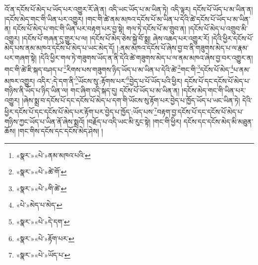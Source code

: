 འོ་ན་དངོས་པོ་མེད་པ་ཡོད་པར་འགྱུར་རོ་ཞེ་ན། འདི་ཡང་ཡོད་པ་མ་ཡིན་ཏེ། འདི་ལྟར། དངོས་པོ་ཡོད་པ་མ་ཡིན་ན། །དངོས་མེད་གང་གི་ཡིན་པར་འགྱུར། །གང་གི་ཚེ་ནམ་མཁའ་དངོས་པོ་མ་ཡིན་པ་དེའི་ཚེ་དངོས་པོ་ཡོད་པ་མ་ཡིན་ན། དངོས་པོ་མེད་པ་གང་གི་ཡིན་པར་བརྟག་པར་བྱ་སྟེ། གལ་ཏེ་དངོས་པོ་མ་གྲུབ་ན། །དངོས་པོ་མེད་པ་འགྲུབ་མི་འགྱུར། །དངོས་པོ་གཞན་དུ་གྱུར་པ་ལ། །དངོས་པོ་མེད་ཅེས་སྐྱེ་བོ་སྨྲ། ཞེས་འཆད་པར་འགྱུར་རོ། །དེའི་ཕྱིར་དངོས་པོ་མེད་པས་ནམ་མཁའ་དངོས་པོ་མེད་པ་ཡང་མེད་དོ། །:ནམ་མཁའ་དངོས་པོ་ཞེས་བྱ་བ་ནི་གཟུགས་མེད་པ་ལ་རྣམ་པར་གཞག་སྟེ། །དེའི་ཕྱིར་གལ་ཏེ་གཟུགས་ཡོད་ན་ནི་དེའི་ཚེ་གཟུགས་མེད་པ་ལ་ནམ་མཁའ་ཞེས་བྱ་བར་འགྱུར་ན། གང་གི་ཚེ་ཇི་སྐད་བཤད་པ་\footnote{«སྣར་»«པེ་»ནམ་མཁའ་པའི་}རིགས་པས་གཟུགས་ཉིད་ཡོད་པ་མ་ཡིན་པ་དེའི་ཚེ་\footnote{«སྣར་»«པེ་»ཚེ་གོ་}གང་གི་\footnote{«སྣར་»«པེ་»གི་ཚེ་}དངོས་པོ་མེད་\footnote{«པེ་»མེད་པ་མེད་}པ་ནམ་མཁར་འགྱུར། འདིར་:དེ་དག་ནི་\footnote{«སྣར་»«པེ་»དེ་དག་}ཡོངས་སུ་:རྟོགས་པར་\footnote{«སྣར་»«པེ་»རྟོག་པར་}བྱེད་པ་པོ་ཡོད་པའི་ཕྱིར། དངོས་པོ་དང་དངོས་པོ་མེད་པ་གཉིས་ནི་ཡོད་པ་ཉིད་ཡིན་ལ། གང་ཞིག་འདི་སྐད་དུ། དངོས་པོ་ཡོད་པ་མ་ཡིན་ན། །དངོས་མེད་གང་གི་ཡིན་པར་འགྱུར། །ཞེས་སྨྲ་བ་དངོས་པོ་དང་དངོས་པོ་མེད་པ་དག་གི་ཡོངས་སུ་རྟོག་པར་བྱེད་པ་ཁྱོད་ཡོད་པ་ཡང་ཡིན་ཏེ། དེའི་ཕྱིར་དངོས་པོ་དང་དངོས་པོ་མེད་པར་རྟོག་པར་བྱེད་པ་ཁྱོད་:ཡོད་པས་\footnote{«སྣར་»«པེ་»ཡོད་པ་}བརྟག་བྱ་དངོས་པོ་དང་དངོས་པོ་མེད་པ་གཉིས་ཀྱང་ཡོད་པ་ཡིན་ནོ་ཞེས་སྨྲའོ། །བརྗོད་པ་འདི་ཡང་མི་རུང་སྟེ། །གང་གི་ཕྱིར། དངོས་དང་དངོས་མེད་མི་མཐུན་ཆོས། །གང་གིས་དངོས་དང་དངོས་མེད་ཤེས། །
